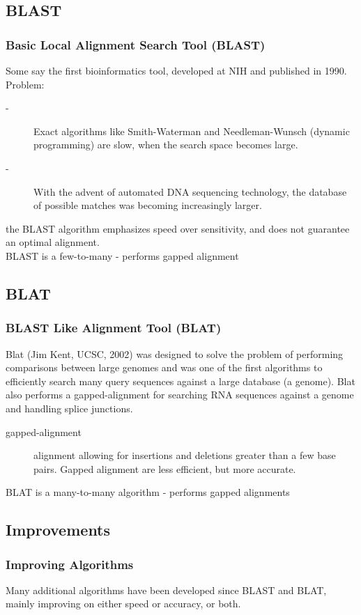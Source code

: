 \documentclass[pdf]{beamer}
\begin{document}
\subsection{BLAST}
\begin{frame}
  \frametitle{Basic Local Alignment Search Tool (BLAST)}
  Some say the first bioinformatics tool, developed at NIH and published in 1990.\\
  Problem:\\
  \begin{description}
  \item[-] Exact algorithms like Smith-Waterman and Needleman-Wunsch (dynamic programming) are slow, when the search space becomes large.
  \item[-] With the advent of automated DNA sequencing technology, the database of possible matches was becoming increasingly larger.
  \end{description}
  the BLAST algorithm emphasizes speed over sensitivity, and does not guarantee an optimal alignment.\\
  \alert{BLAST is a few-to-many - performs gapped alignment}
\end{frame}

\subsection{BLAT}
\begin{frame}
  \frametitle{BLAST Like Alignment Tool (BLAT)}
  Blat (Jim Kent, UCSC, 2002) was designed to solve the problem of performing comparisons between large genomes and was one of the first algorithms to efficiently search many query sequences against a large database (a genome). Blat also performs a gapped-alignment for searching RNA sequences against a genome and handling splice junctions.\\
  \begin{description}
  \item[gapped-alignment] alignment allowing for insertions and deletions greater than a few base pairs. Gapped alignment are less efficient, but more accurate.\\
  \end{description}  
  \alert{BLAT is a many-to-many algorithm - performs gapped alignments}
\end{frame}

\subsection{Improvements}
\begin{frame}
  \frametitle{Improving Algorithms}
  Many additional algorithms have been developed since BLAST and BLAT, mainly improving on either speed or accuracy, or both.
\end{frame}
\end{document}
